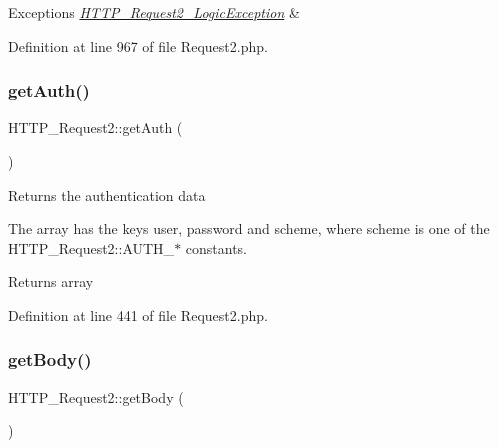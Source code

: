 \begin{DoxyExceptions}{Exceptions}
{\em \hyperlink{classHTTP__Request2__LogicException}{H\+T\+T\+P\+\_\+\+Request2\+\_\+\+Logic\+Exception}} & \\
\hline
\end{DoxyExceptions}


Definition at line 967 of file Request2.\+php.

\hypertarget{classHTTP__Request2_a92573cc9573e255bd2a9fe476153898f}{}\label{classHTTP__Request2_a92573cc9573e255bd2a9fe476153898f} 
\subsubsection{\texorpdfstring{get\+Auth()}{getAuth()}}
{\footnotesize\ttfamily H\+T\+T\+P\+\_\+\+Request2\+::get\+Auth (\begin{DoxyParamCaption}{ }\end{DoxyParamCaption})}

Returns the authentication data

The array has the keys \textquotesingle{}user\textquotesingle{}, \textquotesingle{}password\textquotesingle{} and \textquotesingle{}scheme\textquotesingle{}, where \textquotesingle{}scheme\textquotesingle{} is one of the H\+T\+T\+P\+\_\+\+Request2\+::\+A\+U\+T\+H\+\_\+$\ast$ constants.

\begin{DoxyReturn}{Returns}
array 
\end{DoxyReturn}


Definition at line 441 of file Request2.\+php.

\hypertarget{classHTTP__Request2_a206f758763ed28dce4341babf5c932d0}{}\label{classHTTP__Request2_a206f758763ed28dce4341babf5c932d0} 
\subsubsection{\texorpdfstring{get\+Body()}{getBody()}}
{\footnotesize\ttfamily H\+T\+T\+P\+\_\+\+Request2\+::get\+Body (\begin{DoxyParamCaption}{ }\end{DoxyParamCaption})}

